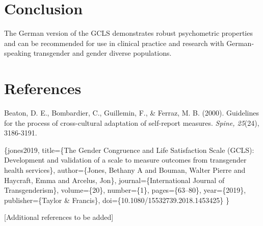 \documentclass[
  english,
  man]{apa6}
\begin{document}
\section{Conclusion}\label{conclusion}

The German version of the GCLS demonstrates robust psychometric properties and can be recommended for use in clinical practice and research with German-speaking transgender and gender diverse populations.

\newpage

\section{References}\label{references}

Beaton, D. E., Bombardier, C., Guillemin, F., \& Ferraz, M. B. (2000). Guidelines for the process of cross-cultural adaptation of self-report measures. \emph{Spine, 25}(24), 3186-3191.

\citet{article}\{jones2019,
title=\{The Gender Congruence and Life Satisfaction Scale (GCLS): Development and validation of a scale to measure outcomes from transgender health services\},
author=\{Jones, Bethany A and Bouman, Walter Pierre and Haycraft, Emma and Arcelus, Jon\},
journal=\{International Journal of Transgenderism\},
volume=\{20\},
number=\{1\},
pages=\{63--80\},
year=\{2019\},
publisher=\{Taylor \& Francis\},
doi=\{10.1080/15532739.2018.1453425\}
\}

{[}Additional references to be added{]}



\end{document}
